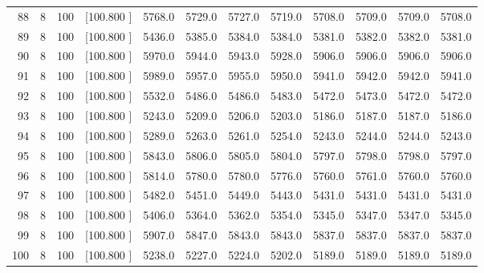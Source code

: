 \documentclass[12pt,a4paper]{article}
\begin{document}
\begin{center}
{\begin{tabular}{r r r r r r r r r r r r}
  88&  8&100&[100.800   ]&  5768.0&  5729.0&  5727.0&  5719.0&  5708.0&  5709.0&  5709.0&  5708.0\\[-0.02in]
  89&  8&100&[100.800   ]&  5436.0&  5385.0&  5384.0&  5384.0&  5381.0&  5382.0&  5382.0&  5381.0\\[-0.02in]
  90&  8&100&[100.800   ]&  5970.0&  5944.0&  5943.0&  5928.0&  5906.0&  5906.0&  5906.0&  5906.0\\[-0.02in]
  91&  8&100&[100.800   ]&  5989.0&  5957.0&  5955.0&  5950.0&  5941.0&  5942.0&  5942.0&  5941.0\\[-0.02in]
  92&  8&100&[100.800   ]&  5532.0&  5486.0&  5486.0&  5483.0&  5472.0&  5473.0&  5472.0&  5472.0\\[-0.02in]
  93&  8&100&[100.800   ]&  5243.0&  5209.0&  5206.0&  5203.0&  5186.0&  5187.0&  5187.0&  5186.0\\[-0.02in]
  94&  8&100&[100.800   ]&  5289.0&  5263.0&  5261.0&  5254.0&  5243.0&  5244.0&  5244.0&  5243.0\\[-0.02in]
  95&  8&100&[100.800   ]&  5843.0&  5806.0&  5805.0&  5804.0&  5797.0&  5798.0&  5798.0&  5797.0\\[-0.02in]
  96&  8&100&[100.800   ]&  5814.0&  5780.0&  5780.0&  5776.0&  5760.0&  5761.0&  5760.0&  5760.0\\[-0.02in]
  97&  8&100&[100.800   ]&  5482.0&  5451.0&  5449.0&  5443.0&  5431.0&  5431.0&  5431.0&  5431.0\\[-0.02in]
  98&  8&100&[100.800   ]&  5406.0&  5364.0&  5362.0&  5354.0&  5345.0&  5347.0&  5347.0&  5345.0\\[-0.02in]
  99&  8&100&[100.800   ]&  5907.0&  5847.0&  5843.0&  5843.0&  5837.0&  5837.0&  5837.0&  5837.0\\[-0.02in]
 100&  8&100&[100.800   ]&  5238.0&  5227.0&  5224.0&  5202.0&  5189.0&  5189.0&  5189.0&  5189.0\\[-0.02in]

\hline
\end{tabular}}
\end{center}
\newpage
\end{document}
